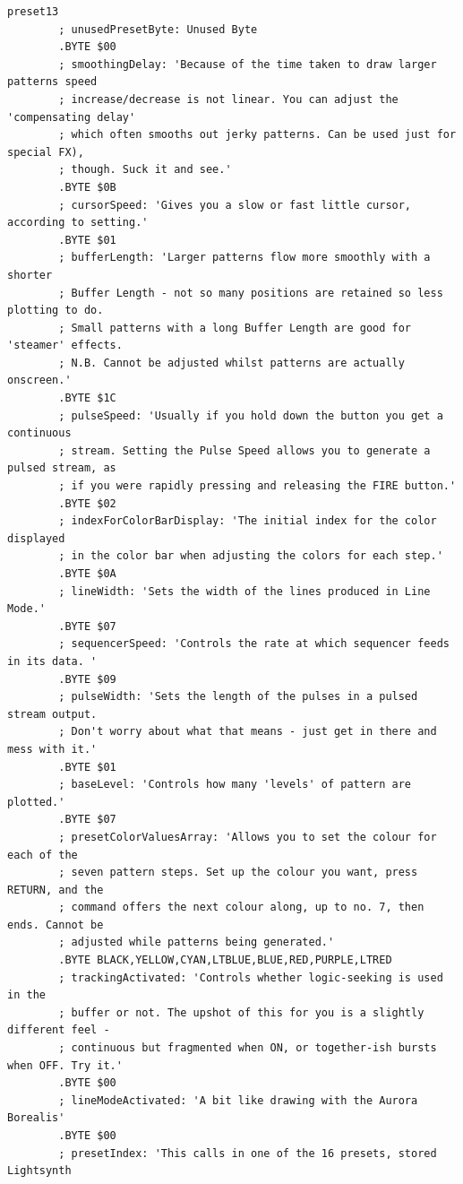 \begin{lstlisting}[basicstyle=\tiny,caption=Source code for Preset 13.]
preset13
        ; unusedPresetByte: Unused Byte
        .BYTE $00
        ; smoothingDelay: 'Because of the time taken to draw larger patterns speed
        ; increase/decrease is not linear. You can adjust the 'compensating delay'
        ; which often smooths out jerky patterns. Can be used just for special FX),
        ; though. Suck it and see.'
        .BYTE $0B
        ; cursorSpeed: 'Gives you a slow or fast little cursor, according to setting.'
        .BYTE $01
        ; bufferLength: 'Larger patterns flow more smoothly with a shorter
        ; Buffer Length - not so many positions are retained so less plotting to do.
        ; Small patterns with a long Buffer Length are good for 'steamer' effects.
        ; N.B. Cannot be adjusted whilst patterns are actually onscreen.'
        .BYTE $1C
        ; pulseSpeed: 'Usually if you hold down the button you get a continuous
        ; stream. Setting the Pulse Speed allows you to generate a pulsed stream, as
        ; if you were rapidly pressing and releasing the FIRE button.'
        .BYTE $02
        ; indexForColorBarDisplay: 'The initial index for the color displayed
        ; in the color bar when adjusting the colors for each step.'
        .BYTE $0A
        ; lineWidth: 'Sets the width of the lines produced in Line Mode.'
        .BYTE $07
        ; sequencerSpeed: 'Controls the rate at which sequencer feeds in its data. '
        .BYTE $09
        ; pulseWidth: 'Sets the length of the pulses in a pulsed stream output.
        ; Don't worry about what that means - just get in there and mess with it.'
        .BYTE $01
        ; baseLevel: 'Controls how many 'levels' of pattern are plotted.'
        .BYTE $07
        ; presetColorValuesArray: 'Allows you to set the colour for each of the
        ; seven pattern steps. Set up the colour you want, press RETURN, and the
        ; command offers the next colour along, up to no. 7, then ends. Cannot be
        ; adjusted while patterns being generated.'
        .BYTE BLACK,YELLOW,CYAN,LTBLUE,BLUE,RED,PURPLE,LTRED
        ; trackingActivated: 'Controls whether logic-seeking is used in the
        ; buffer or not. The upshot of this for you is a slightly different feel -
        ; continuous but fragmented when ON, or together-ish bursts when OFF. Try it.'
        .BYTE $00
        ; lineModeActivated: 'A bit like drawing with the Aurora Borealis'
        .BYTE $00
        ; presetIndex: 'This calls in one of the 16 presets, stored Lightsynth

\end{lstlisting}
